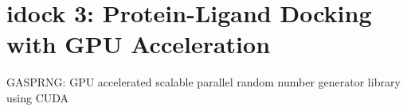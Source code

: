 \chapter{idock 3: Protein-Ligand Docking with GPU Acceleration}

\citep{1401} GASPRNG: GPU accelerated scalable parallel random number generator library using CUDA

\chapterend
